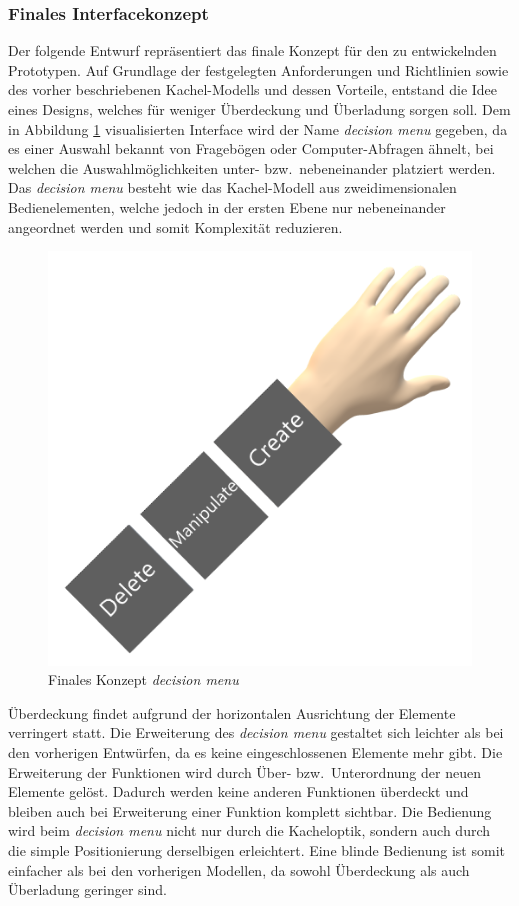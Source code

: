 \subsubsection{Finales Interfacekonzept}
\noindent Der folgende Entwurf repräsentiert das finale Konzept für den zu entwickelnden Prototypen. Auf Grundlage der festgelegten Anforderungen und Richtlinien sowie des vorher beschriebenen Kachel-Modells und dessen Vorteile, entstand die Idee eines Designs, welches für weniger Überdeckung und Überladung sorgen soll. Dem in Abbildung \ref{fig:decisionmenu1} visualisierten Interface wird der Name \textit{decision menu} gegeben, da es einer Auswahl bekannt von Fragebögen oder Computer-Abfragen ähnelt, bei welchen die Auswahlmöglichkeiten unter- bzw.~nebeneinander platziert werden. Das \textit{decision menu} besteht wie das Kachel-Modell aus zweidimensionalen Bedienelementen, welche jedoch in der ersten Ebene nur nebeneinander angeordnet werden und somit Komplexität reduzieren.

\begin{figure}[h]
\captionsetup{width=.7\linewidth}
\includegraphics[scale=0.5]{Bilder/Hauptteil/konzept14}
\centering
\caption{Finales Konzept \textit{decision menu}}
\label{fig:decisionmenu1}
\end{figure}

\noindent Überdeckung findet aufgrund der horizontalen Ausrichtung der Elemente verringert statt. Die Erweiterung des \textit{decision menu} gestaltet sich leichter als bei den vorherigen Entwürfen, da es keine eingeschlossenen Elemente mehr gibt. Die Erweiterung der Funktionen wird durch Über- bzw.~Unterordnung der neuen Elemente gelöst. Dadurch werden keine anderen Funktionen überdeckt und bleiben auch bei Erweiterung einer Funktion komplett sichtbar. Die Bedienung wird beim \textit{decision menu} nicht nur durch die Kacheloptik, sondern auch durch die simple Positionierung derselbigen erleichtert. Eine blinde Bedienung ist somit einfacher als bei den vorherigen Modellen, da sowohl Überdeckung als auch Überladung geringer sind.

